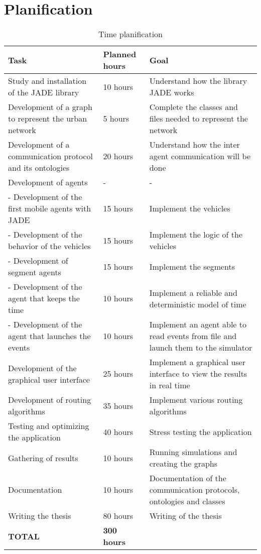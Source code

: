 \section{Planification}

\begin{table}[H]
\centering
\begin{tabularx}{\textwidth}{|X|l|X|}
\hline 
\textbf{Task} & \textbf{Planned hours} & \textbf{Goal} \\ 
\hline 
Study and installation of the JADE library & 10 hours & Understand how the library JADE works \\ 
\hline 
Development of a graph to represent the urban network & 5 hours & Complete the classes and files needed to represent the network \\ 
\hline 
Development of a communication protocol and its ontologies & 20 hours & Understand how the inter agent communication will be done \\ 
\hline 
Development of agents & - & - \\ 
\hline 
- Development of the first mobile agents with JADE & 15 hours & Implement the vehicles \\ 
\hline 
- Development of the behavior of the vehicles & 15 hours & Implement the logic of the vehicles \\ 
\hline 
- Development of segment agents & 15 hours & Implement the segments \\ 
\hline 
- Development of the agent that keeps the time & 10 hours & Implement a reliable and deterministic model of time \\ 
\hline 
- Development of the agent that launches the events & 10 hours & Implement an agent able to read events from file and launch them to the simulator \\ 
\hline 
Development of the graphical user interface & 25 hours & Implement a graphical user interface to view the results in real time \\ 
\hline 
Development of routing algorithms & 35 hours & Implement various routing algorithms \\ 
\hline 
Testing and optimizing the application & 40 hours & Stress testing the application \\ 
\hline 
Gathering of results & 10 hours & Running simulations and creating the graphs \\ 
\hline 
Documentation & 10 hours & Documentation of the communication protocols, ontologies and classes \\ 
\hline 
Writing the thesis & 80 hours & Writing of the thesis \\ 
\hline 
\textbf{TOTAL} & \textbf{300 hours} &  \\ 
\hline 
\end{tabularx}
\caption{Time planification}
\end{table}


